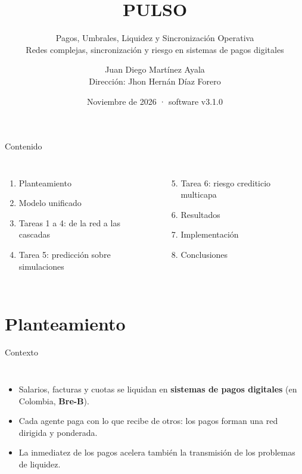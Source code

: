 \documentclass[aspectratio=169,10pt]{beamer}
\title{PULSO}
\subtitle{Pagos, Umbrales, Liquidez y Sincronización Operativa\\[2pt]
\footnotesize Redes complejas, sincronización y riesgo en sistemas de pagos digitales}
\author{Juan Diego Martínez Ayala \\ \small Dirección: Jhon Hernán Díaz Forero}
\institute{\small Semillero de Modelamiento de Sistemas Complejos y Física Computacional}
\date{Noviembre de 2026 · software v3.1.0}
\begin{document}
\maketitle

\begin{frame}{Contenido}
\begin{columns}[T]
\begin{enumerate}
\item Planteamiento
\item Modelo unificado
\item Tareas 1 a 4: de la red a las cascadas
\item Tarea 5: predicción sobre simulaciones
\end{enumerate}
\begin{enumerate}\setcounter{enumi}{4}
\item Tarea 6: riesgo crediticio multicapa
\item Resultados
\item Implementación
\item Conclusiones
\end{enumerate}
\end{columns}
\end{frame}

\section{Planteamiento}

\begin{frame}{Contexto}
\begin{columns}[T]
\begin{itemize}
\item Salarios, facturas y cuotas se liquidan en \textbf{sistemas de pagos digitales}
(en Colombia, \textbf{Bre-B}).
\item Cada agente paga con lo que recibe de otros: los pagos forman una
\alert{red dirigida y ponderada}.
\item La inmediatez de los pagos acelera también la transmisión de los problemas de
liquidez.
\end{itemize}
\centering
{}
\end{columns}
\end{frame}
\end{document}
